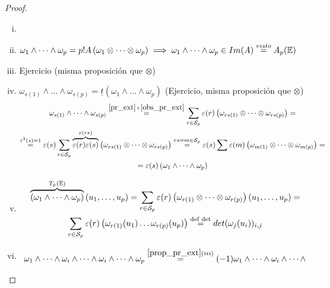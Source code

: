 \begin{proof}
    \begin{enumerate}[i)]
        \item[]
        \item $\omega_1 \wedge \dots \wedge \omega_p = p! A\left(\omega_1 \otimes \dots \otimes \omega_p 
        \right) \implies \omega_1 \wedge \dots \wedge \omega_p \in Im(A) \stackrel{visto}{=} A_p(\mathbb{E})$
        \item Ejercicio (misma proposición que $\otimes$)
        \item $\omega_{s(1)} \wedge \dots \wedge \omega_{s(p)} = \underline{t}(\omega_1 \wedge \dots \wedge 
        \omega_p)$ (Ejercicio, misma proposición que $\otimes$)
        \begin{gather*}
            \omega_{s(1)} \wedge \dots \wedge \omega_{s(p)} \stackrel{\ref{pr_ext} + \ref{obs_pr_ext}}{=}
            \sum_{r \in \mathcal{S}_p} \varepsilon(r) \left( \omega_{rs(1)} \otimes \dots \otimes 
            \omega_{rs(p)} \right) = \\ 
            \stackrel{\varepsilon^2(s)=1}{=} \varepsilon(s) \sum_{r \in \mathcal{S}_p} \overbrace{\varepsilon(r)
            \varepsilon(s)}^{\varepsilon(rs)} \left( \omega_{rs(1)} \otimes \dots \otimes\omega_{rs(p)}
            \right) \stackrel{rs = m \in \mathcal{S}_p}{=} \varepsilon(s) \sum \varepsilon(m)
            \left( \omega_{m(1)} \otimes \dots \otimes \omega_{m(p)} \right) = \\
            = \varepsilon(s) \left( \omega_1 \wedge \dots \wedge \omega_p \right)
        \end{gather*}
        \item 
        \begin{gather*}
        \overbrace{\left( \omega_1 \wedge \dots \wedge \omega_p \right)}^{T_p(\mathbb{E})} \left(u_1,\dots,u_p
        \right) = \sum_{r\in\mathcal{S}_p} \varepsilon(r) \left( \omega_{r(1)} \otimes \dots \otimes 
        \omega_{r(p)} \right) \left( u_1,\dots,u_p \right) = \\
        \sum_{r \in \mathcal{S}_p} \varepsilon(r) \left( \omega_{r(1)}(u_1) \dots \omega_{r(p)}(u_p) \right)
        \stackrel{\text{def det}}{=} det(\omega_j(u_i))_{i,j}
        \end{gather*}
        \item
        \begin{gather*}
        \omega_1 \wedge \dots \wedge \omega_i \wedge \dots \wedge \omega_i \wedge \dots \wedge \omega_p
        \stackrel{\ref{prop_pr_ext} (iii)}{=} (-1) \omega_1 \wedge \dots \wedge \omega_i \wedge \dots \wedge

\end{gather*}
\end{enumerate}
\end{proof}
